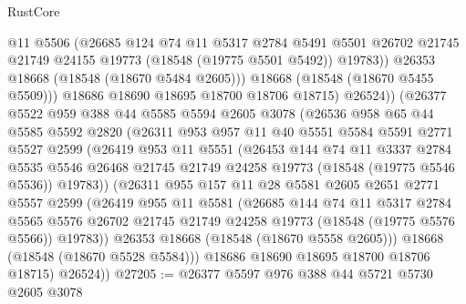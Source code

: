\begin{lexlean}{RustCore}
\begin{coremodule}
                  @11
                  @5506
                  (@26685
                    @124
                    @74
                    @11
                    @5317
                    @2784
                    @5491
                    @5501
                    @26702
                    @21745
                    @21749
                    @24155
                    @19773
                    (@18548 (@19775 @5501 @5492))
                    @19783))
                @26353
                @18668
                (@18548 (@18670 @5484 @2605)))
              @18668
              (@18548 (@18670 @5455 @5509)))
            @18686
            @18690
            @18695
            @18700
            @18706
            @18715)
          @26524))
      (@26377
        @5522
        @959
        @388
        @44
        @5585
        @5594
        @2605
        @3078
        (@26536
          @958
          @65
          @44
          @5585
          @5592
          @2820
          (@26311
            @953
            @957
            @11
            @40
            @5551
            @5584
            @5591
            @2771
            @5527
            @2599
            (@26419
              @953
              @11
              @5551
              (@26453
                @144
                @74
                @11
                @3337
                @2784
                @5535
                @5546
                @26468
                @21745
                @21749
                @24258
                @19773
                (@18548 (@19775 @5546 @5536))
                @19783))
            (@26311
              @955
              @157
              @11
              @28
              @5581
              @2605
              @2651
              @2771
              @5557
              @2599
              (@26419
                @955
                @11
                @5581
                (@26685
                  @144
                  @74
                  @11
                  @5317
                  @2784
                  @5565
                  @5576
                  @26702
                  @21745
                  @21749
                  @24258
                  @19773
                  (@18548 (@19775 @5576 @5566))
                  @19783))
              @26353
              @18668
              (@18548 (@18670 @5558 @2605)))
            @18668
            (@18548 (@18670 @5528 @5584)))
          @18686
          @18690
          @18695
          @18700
          @18706
          @18715)
        @26524))
@27205 := @26377 @5597 @976 @388 @44 @5721 @5730 @2605 @3078

\end{coremodule}
\end{lexlean}
